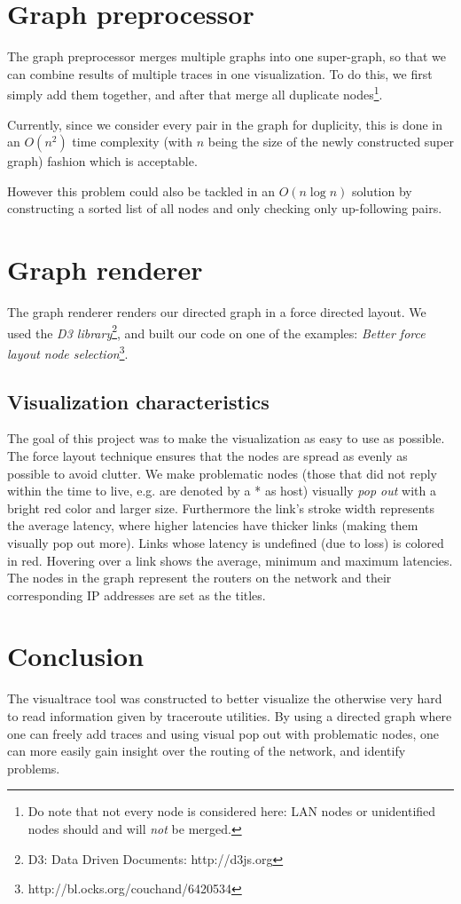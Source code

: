 \documentclass[a4paper,10pt]{article}
\begin{document}
\section{Graph preprocessor}
The graph preprocessor merges multiple graphs into one super-graph, so that we can combine results of multiple traces in one visualization. To do this, we first simply add them together, and after that merge all duplicate nodes\footnote{Do note that not every node is considered here: LAN nodes or unidentified nodes should and will \emph{not} be merged.}.

Currently, since we consider every pair in the graph for duplicity, this is done in an $O(n^2)$ time complexity (with $n$ being the size of the newly constructed super graph) fashion which is acceptable.

However this problem could also be tackled in an $O(n \log n)$ solution by constructing a sorted list of all nodes and only checking only up-following pairs.

\section{Graph renderer}
The graph renderer renders our directed graph in a force directed layout. We used the \emph{D3 library}\footnote{D3: Data Driven Documents: http://d3js.org}, and built our code on one of the examples: \emph{Better force layout node selection}\footnote{http://bl.ocks.org/couchand/6420534}. 

\subsection{Visualization characteristics}
The goal of this project was to make the visualization as easy to use as possible. The force layout technique ensures that the nodes are spread as evenly as possible to avoid clutter. We make problematic nodes (those that did not reply within the time to live, e.g. are denoted by a * as host) visually \emph{pop out} with a bright red color and larger size. Furthermore the link's stroke width represents the average latency, where higher latencies have thicker links (making them visually pop out more). Links whose latency is undefined (due to loss) is colored in red. Hovering over a link shows the average, minimum and maximum latencies. The nodes in the graph represent the routers on the network and their corresponding IP addresses are set as the titles.

\section{Conclusion}
The visualtrace tool was constructed to better visualize the otherwise very hard to read information given by traceroute utilities. By using a directed graph where one can freely add traces and using visual pop out with problematic nodes, one can more easily gain insight over the routing of the network, and identify problems.
\end{document}
